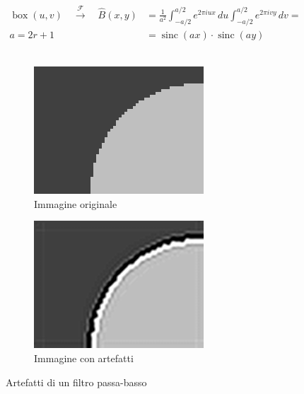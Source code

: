 \documentclass[../main.tex]{subfiles}
\begin{document}
\begin{equation}
	\begin{aligned}
		\operatorname{box}(u,v) \quad\overset{\mathcal{F}}{\longrightarrow}\quad \hat{B}(x,y) &=  \frac{1}{a^2}\int_{-a/2}^{a/2}e^{2\pi iux}\,du\int_{-a/2}^{a/2}e^{2\pi ivy}\,dv =\\
		\boxed{a = 2r + 1} \qquad\quad &= \operatorname{sinc}(ax)\cdot\operatorname{sinc}(ay)
	\end{aligned}
\end{equation}\\[-10pt]

\begin{figure}[ht]
	\centering
	\begin{subfigure}{0.4\linewidth}
		\centering
		\includegraphics[keepaspectratio, width=\linewidth]{images/ringing_orignal.png}
		\caption{Immagine originale}
	\end{subfigure}
	\hspace{20pt}
	\begin{subfigure}{0.4\linewidth}
		\centering
		\includegraphics[keepaspectratio, width=\linewidth]{images/ringing_artifact.png}
		\caption{Immagine con artefatti}
	\end{subfigure}
	\caption[Artefatti di un filtro passa-basso ideale]{
		Artefatti di un filtro passa-basso \cite{ringingImage}}
\end{figure}
\end{document}
